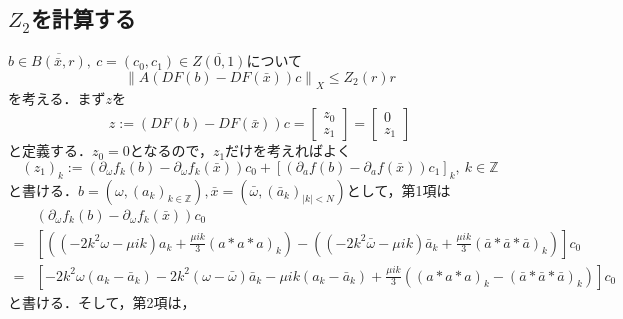\subsection{$Z_2$を計算する}
$b \in \overline{B\left(\bar{x},r\right)},\ c=\left(c_0,c_1\right)\in\overline{Z(0,1)}$について
\begin{equation*}
  \left\| A \left( DF \left( b \right) - DF \left( \bar{x} \right) \right) c \right\|_X \leq Z_2(r)r
\end{equation*}
を考える．まず$z$を
\begin{equation*}
  z := \left( DF(b) - DF(\bar{x}) \right) c = \begin{bmatrix}
    z_0 \\
    z_1
  \end{bmatrix}
  = \begin{bmatrix}
    0 \\
    z_1
  \end{bmatrix}
\end{equation*}
と定義する．$z_0=0$となるので，$z_1$だけを考えればよく
\begin{equation*}
  \left(z_1\right)_k := \left(\partial_\omega f_k \left(b\right) - \partial_\omega f_k \left(\bar{x}\right) \right)c_0 + \left[ \left(\partial_a f\left(b\right) - \partial_a f \left(\bar{x}\right) \right) c_1 \right]_k,\ k \in \mathbb{Z}
\end{equation*}
と書ける．$b=\left( \omega, \left(a_k\right)_{k\in\mathbb{Z}} \right), \bar{x}=\left( \bar{\omega}, \left(\bar{a}_k\right)_{|k|<N} \right)$として，第1項は
\begin{equation*}
  \begin{split}
    &\left(\partial_\omega f_k \left(b\right) - \partial_\omega f_k \left(\bar{x}\right) \right)c_0 \\
    =& \left[ \left( \left( -2k^2\omega - \mu ik \right) a_k + \frac{\mu ik}{3} \left( a*a*a \right)_k \right) - \left( \left( -2k^2\bar{\omega} - \mu ik \right) \bar{a}_k       + \frac{\mu ik}{3} \left( \bar{a}*\bar{a}*\bar{a} \right)_k \right) \right]c_0 \\
    =& \left[  -2k^2\omega \left( a_k - \bar{a}_k \right) -2k^2\left( \omega - \bar{\omega} \right)\bar{a}_k - \mu ik \left( a_k - \bar{a}_k \right) + \frac{\mu ik}{3} \left( \left( a*a*a \right)_k - \left(\bar{a}*\bar{a}*\bar{a}\right)_k \right) \right] c_0
  \end{split}
\end{equation*}
と書ける．そして，第2項は，
